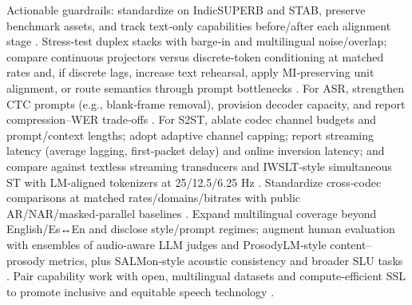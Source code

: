 Actionable guardrails: standardize on IndicSUPERB and STAB, preserve benchmark assets, and track text‑only capabilities before/after each alignment stage \cite{vashishth2024stabspeechtokenizerassessmentbenchmark,entry2025indicsuperbspeechprocessinguniversalperf}. Stress‑test duplex stacks with barge‑in and multilingual noise/overlap; compare continuous projectors versus discrete‑token conditioning at matched rates and, if discrete lags, increase text rehearsal, apply MI‑preserving unit alignment, or route semantics through prompt bottlenecks \cite{ma2024languagemodelcanlistenwhilespeaking,wang2025bossbeyondsemanticspeech,tsunoo2024decoderonlyarchitecturespeechrecognition}. For ASR, strengthen CTC prompts (e.g., blank‑frame removal), provision decoder capacity, and report compression–WER trade‑offs \cite{tsunoo2024decoderonlyarchitecturespeechrecognition}. For S2ST, ablate codec channel budgets and prompt/context lengths; adopt adaptive channel capping; report streaming latency (average lagging, first‑packet delay) and online inversion latency; and compare against textless streaming transducers and IWSLT‑style simultaneous ST with LM‑aligned tokenizers at 25/12.5/6.25 Hz \cite{peng2024mslms2stmultitaskspeechlanguagemodeltext,jo2025lmsptalignedsemanticdistillationspeechto,ouyang2025cmusiwslt2025simultaneousspeechtranslati,zhao2024textlessstreamingspeechtranslationsemant,sheng2025syncspeechlowlatencyefficientdualstreamt}. Standardize cross‑codec comparisons at matched rates/domains/bitrates with public AR/NAR/masked‑parallel baselines \cite{li2024investigatingneuralaudiocodecsspeechlang}. Expand multilingual coverage beyond English/Es↔En and disclose style/prompt regimes; augment human evaluation with ensembles of audio‑aware LLM judges and ProsodyLM‑style content–prosody metrics, plus SALMon‑style acoustic consistency and broader SLU tasks \cite{qian2025prosodylmuncoveringemergingprosodyproces,chiang2025audioawarelargelanguagemodelsasjudgesspe,maimon2025salmonsuiteacousticlanguagemodelevaluati,entry2025indicsuperbspeechprocessinguniversalperf}. Pair capability work with open, multilingual datasets and compute‑efficient SSL to promote inclusive and equitable speech technology \cite{chen2023reducingbarriersselfsupervisedlearninghu,entry2025indicsuperbspeechprocessinguniversalperf,wang2025bossbeyondsemanticspeech,yang2024buildingtaiwanesemandarinspokenlanguagem,fily2024establishingdegreesclosenessbetweenaudio}.

















